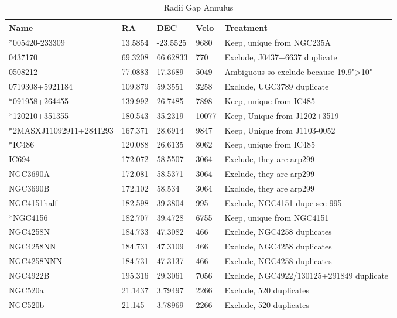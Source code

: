 \documentclass[10pt]{article}
\begin{document}
\begin {table}
\caption {Radii Gap Annulus} \label{radiigap}
\begin{center}
{\footnotesize \begin{tabular} {|p{4cm}|p{1.2cm}|p{1.2cm}|p{0.8cm}|p{6.7cm}|}
  \hline
\large Name & \large RA & \large DEC & \large Velo & \large Treatment \\
 \hline 
 \hline
*005420-233309 & 13.5854 & -23.5525 & 9680 & Keep, unique from NGC235A \\ \hline
0437170 & 69.3208 & 66.62833 & 770 & Exclude, J0437+6637 duplicate \\ \hline
0508212 & 77.0883 & 17.3689 & 5049 & Ambiguous so exclude because 19.9">10" \\ \hline
0719308+5921184 & 109.879 & 59.3551 & 3258 & Exclude, UGC3789 duplicate \\ \hline
*091958+264455 & 139.992 & 26.7485 & 7898 & Keep, unique from IC485 \\ \hline
*120210+351355 & 180.543 & 35.2319 & 10077 & Keep, Unique from J1202+3519 \\ \hline
*2MASXJ11092911+2841293 & 167.371 & 28.6914 & 9847 & Keep, Unique from J1103-0052 \\ \hline
*IC486 & 120.088 & 26.6135 & 8062 & Keep, unique from IC485 \\ \hline
IC694 & 172.072 & 58.5507 & 3064 & Exclude, they are arp299 \\ \hline
NGC3690A & 172.081 & 58.5371 & 3064 & Exclude, they are arp299 \\ \hline
NGC3690B & 172.102 & 58.534 & 3064 & Exclude, they are arp299 \\ \hline
NGC4151half & 182.598 & 39.3804 & 995 & Exclude, NGC4151 dupe see 995 \\ \hline
*NGC4156 & 182.707 & 39.4728 & 6755 & Keep, unique from NGC4151 \\ \hline
NGC4258N & 184.733 & 47.3082 & 466 & Exclude, NGC4258 duplicates \\ \hline
NGC4258NN & 184.731 & 47.3109 & 466 & Exclude, NGC4258 duplicates \\ \hline
NGC4258NNN & 184.731 & 47.3137 & 466 & Exclude, NGC4258 duplicates \\ \hline
NGC4922B & 195.316 & 29.3061 & 7056 & Exclude, NGC4922/130125+291849 duplicate \\ \hline
NGC520a	 & 21.1437 & 3.79497 & 2266 & Exclude, 520 duplicates \\ \hline
NGC520b	 & 21.145 & 3.78969 & 2266 & Exclude, 520 duplicates \\ \hline

\end{tabular}}
\end{center}
\end{table}
\end{document}
